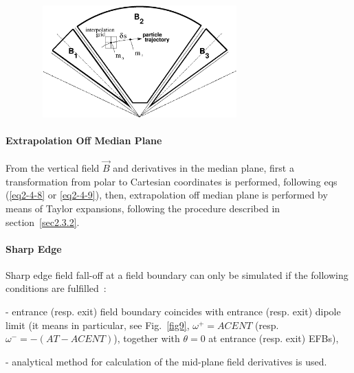 \begin{figure}[h]
 \begin{center}
\includegraphics*[bbllx=30,bblly=150,bburx=590,bbury=400,width=8.2cm,height=4.3cm]{grid.eps}
{\setlength{\captionwidth}{12cm}
  }
  \end{center}
\end{figure}


\bigskip

\paragraph{Extrapolation Off Median Plane} 

\noindent From the vertical field $ \vec  B $ and  derivatives in the median plane, 
first a transformation from polar to Cartesian coordinates is 
performed, following eqs (\ref{eq2-4-8} or \ref{eq2-4-9}), then,  extrapolation off median plane is 
performed by means of Taylor expansions, following the procedure described in section~\ref{sec2.3.2}. 




\bigskip

\paragraph{Sharp Edge} 

\noindent Sharp edge field fall-off at a field boundary  can only be simulated if the following conditions are fulfilled~: 

- entrance (resp. exit)  field boundary  coincides with entrance (resp. exit) 
dipole limit (it means in particular, see Fig.~\ref{fig9},  
$\omega^+= ACENT$ (resp. $\omega^- = -(AT-ACENT)$), 
together with $\theta=0$ at entrance (resp. exit) EFBs), 

- analytical method for calculation of the  mid-plane field derivatives is used. 








